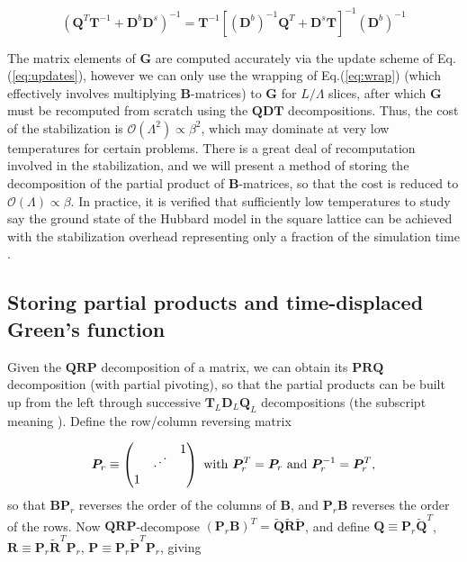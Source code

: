 \begin{equation}
( \bm Q^T \bm T^{-1} + \bm D^b \bm D^s )^{-1} = \bm T^{-1} [ (\bm D^b)^{-1} \bm Q^T + \bm D^s \bm T ]^{-1} (\bm D^b)^{-1}
\end{equation}

The matrix elements of $\bm G$ are computed accurately via the update scheme of Eq.(\ref{eq:updates}), however we can only use the wrapping of Eq.(\ref{eq:wrap}) (which effectively involves multiplying $\bm B$-matrices) to   $\bm G$ for $L / \Lambda$ slices, after which $\bm G$ must be recomputed from scratch using the $\bm Q \bm D \bm T$ decompositions.
Thus, the cost of the stabilization is $\mathcal{O} ( \Lambda^2 ) \propto 
\beta^2$, which may dominate at very low temperatures for certain problems.
There is a great deal of recomputation involved in the stabilization, and we will present a method of storing the decomposition of the partial product of $\bm B$-matrices, so that the cost is reduced to $\mathcal{O}(\Lambda) \propto \beta$.
In practice, it is verified that sufficiently low temperatures to study say the ground state of the Hubbard model in the square lattice can be achieved with the stabilization overhead representing only a fraction of the simulation time \cite{hanke_electronic_nodate,white_numerical_1989}.

\subsection{Storing partial products and time-displaced Green's function}
\label{subsec:partial}

Given the $\bm Q \bm R \bm P$ decomposition of a matrix, we can obtain its $\bm P \bm R \bm Q$ decomposition (with partial pivoting), so that the partial products can be built up from the left through successive $\bm T_L \bm D_L \bm Q_L$ decompositions (the subscript meaning ).
Define the row/column reversing matrix 

\begin{equation}
\bm P_r \equiv
\begin{pmatrix}
 & & 1 \\
 & \rddots & \\
1& & 
\end{pmatrix}
\,\, \text{with} \,\, \bm P_r^T = \bm P_r \,\, \text{and} \,\, \bm P_r^{-1} = \bm P_r^T ,
\end{equation}
so that $\bm B \bm P_r$ reverses the order of the columns of $\bm B$, and $\bm P_r \bm B$ reverses the order of the rows.
Now $\bm Q \bm R \bm P$-decompose $(\bm P_r \bm B)^T = \tilde{\bm Q} \tilde{\bm R} \tilde{\bm P}$, and define $\bm Q \equiv \bm P_r \tilde{\bm Q}^T$, $\bm R \equiv \bm P_r \tilde{\bm R}^T \bm P_r$, $\bm P \equiv \bm P_r \tilde{\bm P}^T \bm P_r$, giving

